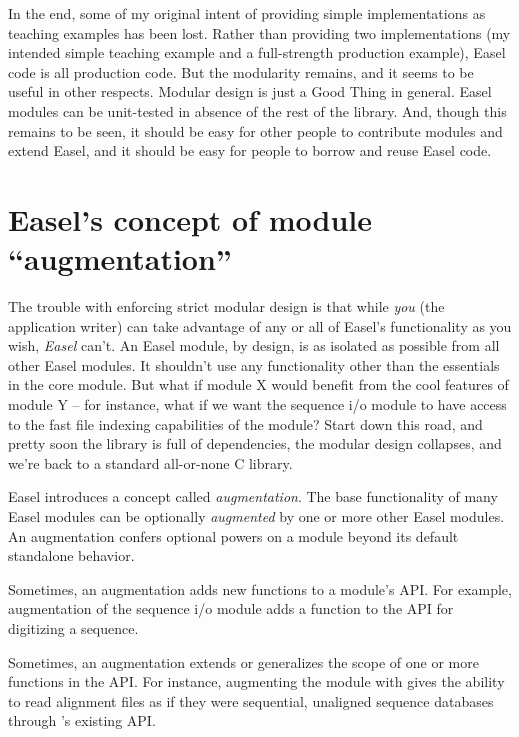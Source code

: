 In the end, some of my original intent of providing simple
implementations as teaching examples has been lost. Rather than
providing two implementations (my intended simple teaching example and
a full-strength production example), Easel code is all production
code. But the modularity remains, and it seems to be useful in other
respects.  Modular design is just a Good Thing in general.  Easel
modules can be unit-tested in absence of the rest of the library.
And, though this remains to be seen, it should be easy for other
people to contribute modules and extend Easel, and it should be easy
for people to borrow and reuse Easel code.

\section{Easel's concept of module ``augmentation''}

The trouble with enforcing strict modular design is that while
\emph{you} (the application writer) can take advantage of any or all
of Easel's functionality as you wish, \emph{Easel} can't. An Easel
module, by design, is as isolated as possible from all other Easel
modules. It shouldn't use any functionality other than the essentials
in the core  module. But what if module X would benefit
from the cool features of module Y -- for instance, what if we want
the  sequence i/o module to have access to the fast file
indexing capabilities of the  module?  Start down this
road, and pretty soon the library is full of dependencies, the modular
design collapses, and we're back to a standard all-or-none C library.

Easel introduces a concept called \emph{augmentation}. The base
functionality of many Easel modules can be optionally \emph{augmented}
by one or more other Easel modules. An augmentation confers optional
powers on a module beyond its default standalone behavior.

Sometimes, an augmentation adds new functions to a module's API.  For
example,  augmentation of the sequence i/o module
 adds a function to the  API for digitizing
a sequence.

Sometimes, an augmentation extends or generalizes the scope of one or
more functions in the API. For instance, augmenting the 
module with  gives the ability to read alignment files as
if they were sequential, unaligned sequence databases through
's existing API.

